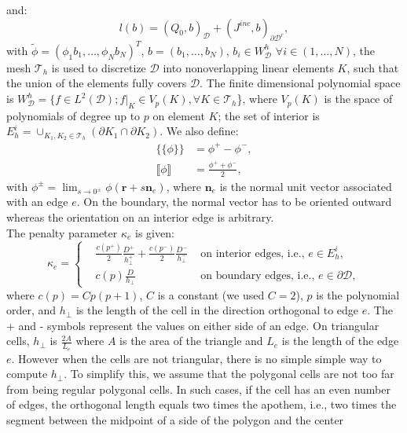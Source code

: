 \documentclass[preprint,10pt]{elsarticle}
\newcommand\br{\mathbf{r}}
\newcommand\bs{\boldsymbol}
\newcommand\ldb{\{\!\!\{}
\newcommand\rdb{\}\!\!\}}
\newcommand\llb{\llbracket}
\newcommand\rrb{\rrbracket}
\newcommand\mc{\mathcal}
\renewcommand{\(}{\left(}
\renewcommand{\)}{\right)}
\renewcommand{\[}{\left[}
\renewcommand{\]}{\right]}
\begin{document}
and:
\begin{equation}
  l(b) = (Q_0,b)_{\mc{D}} + (J^{inc},b)_{\partial
  \mc{D}^r},
\end{equation}
with $\tilde{\phi}=(\phi_1 b_1,\hdots, \phi_N b_N)^T$, $b = (b_1,\hdots,b_N)$,
$b_i \in W_{\mc{D}}^h$ $\forall i \in (1,\hdots,N)$,
the mesh $\mc{T}_h$ is used to discretize $\mc{D}$ into nonoverlapping linear
elements $K$, such that the union of the elements fully covers $\mc{D}$. The
finite dimensional polynomial space is $W_{\mc{D}}^h = \{f \in L^2(\mc{D});
f|_K \in V_p(K), \forall K \in \mc{T}_h$\}, where $V_p(K)$ is the space of
polynomials of degree up to $p$ on element $K$; the set of interior is $E_h^i
= \cup _{K_1,K_2\in \mc{T}_h}(\partial K_1 \cap \partial K_2)$. We also
define:
\begin{align}
  \ldb \phi \rdb &= \phi^+ - \phi^-,\\
  \llb \phi \rrb &=  \frac{\phi^++\phi^-}{2},
\end{align}
with $\phi^{\pm} = \lim_{s\rightarrow 0^{\pm}} \phi(\br+s \bs{n}_e)$, where
$\bs{n}_e$ is the normal unit vector associated with an edge $e$. On the boundary, 
the normal vector has to be oriented outward whereas the orientation on an
interior edge is arbitrary.\\
The penalty parameter $\kappa_e$ is given:
\begin{equation}
  \kappa_e = \left\{
    \begin{aligned}
      &\frac{c(p^+)}{2}\frac{D^+}{h_{\bot}^+}+\frac{c(p^-)}{2}
      \frac{D^-}{h_{\bot}^-} & \textrm{ on interior edges, i.e., } e \in
      E_h^i,\\
      & c(p)\frac{D}{h_{\bot}} & \textrm{ on boundary edges, i.e., } e\in
      \partial \mc{D},
    \end{aligned}
    \right.
\end{equation}
where $c(p) =Cp(p+1)$, $C$ is a constant (we used $C=2$), $p$ is the
polynomial order,  and $h_{\bot}$ is the length of the cell in the direction 
orthogonal to edge $e$. The + and - symbols represent the values on either 
side of an edge. On triangular cells, $h_{\bot}$ is $\frac{2A}{L_e}$ where $A$
is the area of the triangle and $L_e$ is the length of the edge $e$. However
when the cells are not triangular, there is no simple simple way to compute
$h_{\bot}$. To simplify this, we assume that the polygonal cells are not too
far from being regular polygonal cells. In such cases, if the cell has an even
number of edges, the orthogonal length equals two times the apothem, i.e., two
times the segment between the midpoint of a side of the polygon and the center
\end{document}
